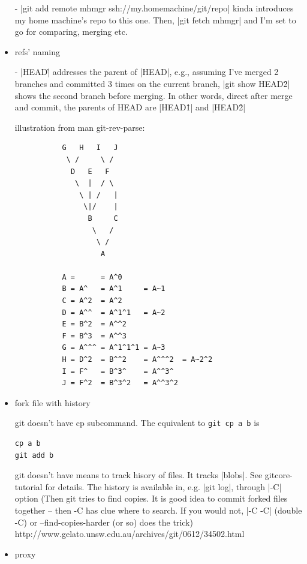 \begin{itemize}
- |git add remote mhmgr ssh://my.homemachine/git/repo| kinda introduces
  my home machine's repo to this one. Then, |git fetch mhmgr| and I'm
  set to go for comparing, merging etc.

\item{refs' naming}

- |HEAD\^| addresses the parent of |HEAD|, e.g., assuming I've
  merged 2 branches and committed 3 times on the current branch,
  |git show HEAD\^2| shows the second branch before merging. In
  other words, direct after merge and commit, the parents of HEAD are
  |HEAD\^1|  and |HEAD\^2|

   illustration from man git-rev-parse:

   \begin{code} \begin{verbatim}
           G   H   I   J
            \ /     \ /
             D   E   F
              \  |  / \
               \ | /   |
                \|/    |
                 B     C
                  \   /
                   \ /
                    A

           A =      = A^0
           B = A^   = A^1     = A~1
           C = A^2  = A^2
           D = A^^  = A^1^1   = A~2
           E = B^2  = A^^2
           F = B^3  = A^^3
           G = A^^^ = A^1^1^1 = A~3
           H = D^2  = B^^2    = A^^^2  = A~2^2
           I = F^   = B^3^    = A^^3^
           J = F^2  = B^3^2   = A^^3^2

\end{verbatim} \end{code}

\item{fork file with history}

git doesn't have cp subcommand. The equivalent to \verb+git cp a b+ is
\begin{code}\begin{verbatim}
cp a b
git add b
\end{verbatim} \end{code}

git doesn't have means to track hisory of files. It tracks |blobs|.
See gitcore-tutorial for details. The history is available in, e.g.
%
|git log|, through |-C| option (Then git tries to find copies.
It is good idea to commit forked files together -- then -C has clue
where to search. If you would not, |-C -C| (double -C) or
--find-copies-harder (or so) does the trick)
http://www.gelato.unsw.edu.au/archives/git/0612/34502.html

\item{proxy}


\end{itemize}
